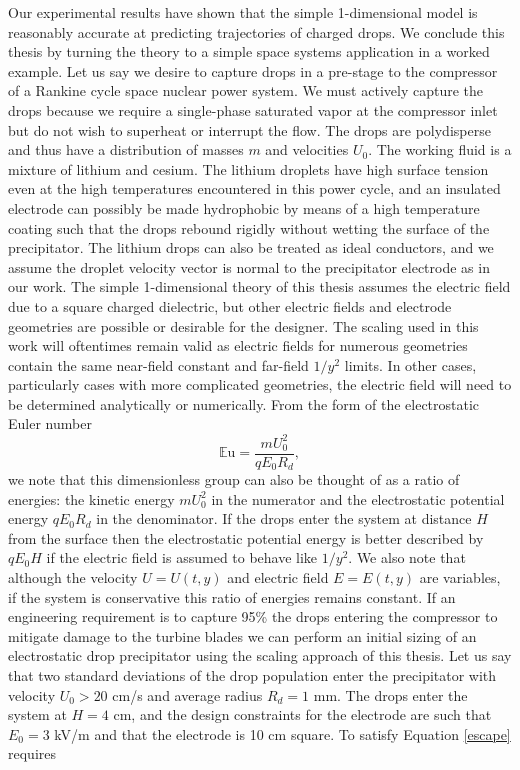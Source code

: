 \documentclass[12pt,a4paper,oneside]{book}
\begin{document}
Our experimental results have shown that the simple 1-dimensional model is reasonably accurate at predicting trajectories of charged drops.   We conclude this thesis by turning the theory to a simple space systems application in a worked example. Let us say we desire to capture drops in a pre-stage to the compressor of a Rankine cycle space nuclear power system. We must actively capture the drops because we require a single-phase saturated vapor at the compressor inlet but do not wish to superheat or interrupt the flow. The drops are polydisperse and thus have a distribution of masses $m$ and velocities $U_0$. The working fluid is a mixture of lithium and cesium. The lithium droplets have high surface tension even at the high temperatures encountered in this power cycle, and an insulated electrode can possibly be made hydrophobic by means of a high temperature coating such that the drops rebound rigidly without wetting the surface of the precipitator. The lithium drops can also be treated as ideal conductors, and we assume the droplet velocity vector is normal to the precipitator electrode as in our work. The simple 1-dimensional theory of this thesis assumes the electric field due to a square charged dielectric, but other electric fields and electrode geometries are possible or desirable for the designer. The scaling used in this work will oftentimes remain valid as electric fields for numerous geometries contain the same near-field constant and far-field $1/y^2$ limits. In other cases, particularly cases with more complicated geometries, the electric field will need to be determined analytically or numerically. From the form of the electrostatic Euler number
\[
\mathbb{E}\mbox{u} = \frac{m U_0^2}{q E_0 R_d},
\]
we note that this dimensionless group can also be thought of as a ratio of energies: the kinetic energy $m U_0^2$ in the numerator and the electrostatic potential energy $q E_0 R_d$ in the denominator. If the drops enter the system at distance $H$ from the surface then the electrostatic potential energy is better described by $q E_0 H$ if the electric field is assumed to behave like $1/y^2$. We also note that although the velocity $U = U(t,y)$ and electric field $E = E(t,y)$ are variables, if the system is conservative this ratio of energies remains constant. If an engineering requirement is to capture 95\% the drops entering the compressor to mitigate damage to the turbine blades we can perform an initial sizing of an electrostatic drop precipitator using the scaling approach of this thesis. Let us say that two standard deviations of the drop population enter the precipitator with velocity $U_0 > 20$ cm/s and average radius $R_d = 1$ mm. The drops enter the system at $H=4$ cm, and the design constraints for the electrode are such that $E_0=3$ kV/m and that the electrode is 10 cm square. To satisfy Equation \ref{escape} requires
\end{document}
